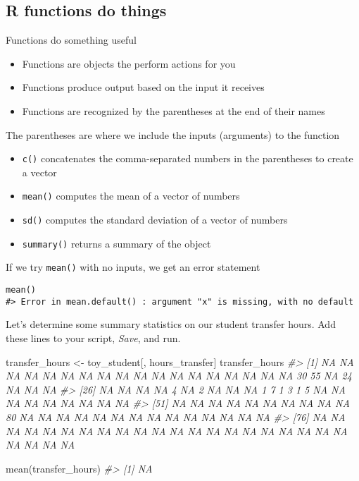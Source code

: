 \documentclass[
]{book}
\newenvironment{Shaded}{\begin{snugshade}}{\end{snugshade}}
\newcommand{\CommentTok}[1]{\textcolor[rgb]{0.56,0.35,0.01}{\textit{#1}}}
\newcommand{\FunctionTok}[1]{\textcolor[rgb]{0.00,0.00,0.00}{#1}}
\newcommand{\NormalTok}[1]{#1}
\newcommand{\OtherTok}[1]{\textcolor[rgb]{0.56,0.35,0.01}{#1}}
\providecommand{\tightlist}{%
  \setlength{\itemsep}{0pt}\setlength{\parskip}{0pt}}
\begin{document}
\hypertarget{r-functions-do-things}{%
\subsection{R functions do things}\label{r-functions-do-things}}

Functions do something useful

\begin{itemize}
\tightlist
\item
  Functions are objects the perform actions for you
\item
  Functions produce output based on the input it receives
\item
  Functions are recognized by the parentheses at the end of their names
\end{itemize}

The parentheses are where we include the inputs (arguments) to the function

\begin{itemize}
\tightlist
\item
  \texttt{c()} concatenates the comma-separated numbers in the parentheses to create a vector
\item
  \texttt{mean()} computes the mean of a vector of numbers
\item
  \texttt{sd()} computes the standard deviation of a vector of numbers
\item
  \texttt{summary()} returns a summary of the object
\end{itemize}

If we try \texttt{mean()} with no inputs, we get an error statement

\begin{verbatim}
mean()
#> Error in mean.default() : argument "x" is missing, with no default
\end{verbatim}

Let's determine some summary statistics on our student transfer hours. Add these lines to your script, \emph{Save}, and run.

\begin{Shaded}
\begin{Highlighting}[]
\NormalTok{transfer\_hours }\OtherTok{\textless{}{-}}\NormalTok{ toy\_student[, hours\_transfer]}
\NormalTok{transfer\_hours}
\CommentTok{\#\textgreater{}   [1] NA NA NA NA NA NA NA NA NA NA NA NA NA NA NA NA NA NA 30 55 NA 24 NA NA NA}
\CommentTok{\#\textgreater{}  [26] NA NA NA NA  4 NA  2 NA NA NA  1  7  1  3  1  5 NA NA NA NA NA NA NA NA NA}
\CommentTok{\#\textgreater{}  [51] NA NA NA NA NA NA NA NA NA NA 80 NA NA NA NA NA NA NA NA NA NA NA NA NA NA}
\CommentTok{\#\textgreater{}  [76] NA NA NA NA NA NA NA NA NA NA NA NA NA NA NA NA NA NA NA NA NA NA NA NA NA}

\FunctionTok{mean}\NormalTok{(transfer\_hours)}
\CommentTok{\#\textgreater{} [1] NA}
\end{Highlighting}
\end{Shaded}
\end{document}
